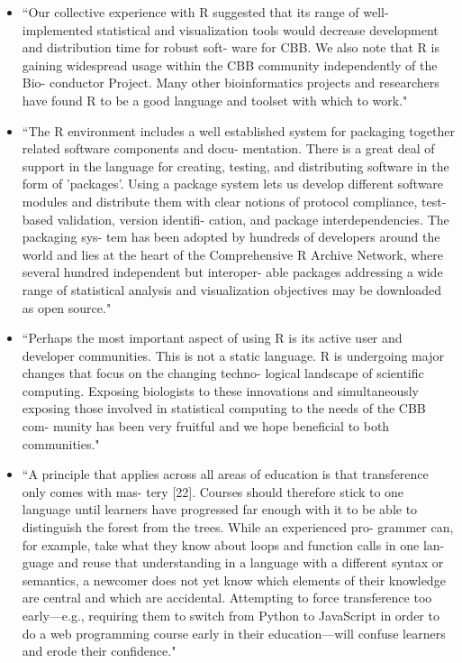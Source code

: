 \documentclass[pdftex,english,11pt,parskip=half]{scrartcl}
\begin{document}
\begin{itemize}
\item ``Our collective experience with R suggested that its range of well-implemented statistical and visualization tools would decrease development and distribution time for robust soft- ware for CBB. We also note that R is gaining widespread usage within the CBB community independently of the Bio- conductor Project. Many other bioinformatics projects and researchers have found R to be a good language and toolset with which to work." \cite{gentleman2004bioconductor}
\item ``The R environment includes a well established system for packaging together related software components and docu- mentation. There is a great deal of support in the language for creating, testing, and distributing software in the form of 'packages'. Using a package system lets us develop different software modules and distribute them with clear notions of protocol compliance, test-based validation, version identifi- cation, and package interdependencies. The packaging sys- tem has been adopted by hundreds of developers around the world and lies at the heart of the Comprehensive R Archive Network, where several hundred independent but interoper- able packages addressing a wide range of statistical analysis and visualization objectives may be downloaded as open source." \cite{gentleman2004bioconductor}
\item ``Perhaps the most important aspect of using R is its active user and developer communities. This is not a static language. R is undergoing major changes that focus on the changing techno- logical landscape of scientific computing. Exposing biologists to these innovations and simultaneously exposing those involved in statistical computing to the needs of the CBB com- munity has been very fruitful and we hope beneficial to both communities." \cite{gentleman2004bioconductor}
\item ``A principle that applies across all areas of education is that transference only comes with mas- tery [22]. Courses should therefore stick to one language until learners have progressed far enough with it to be able to distinguish the forest from the trees. While an experienced pro- grammer can, for example, take what they know about loops and function calls in one lan- guage and reuse that understanding in a language with a different syntax or semantics, a newcomer does not yet know which elements of their knowledge are central and which are accidental. Attempting to force transference too early—e.g., requiring them to switch from Python to JavaScript in order to do a web programming course early in their education—will confuse learners and erode their confidence." \cite{brown2018ten}
\end{itemize}
\end{document}
